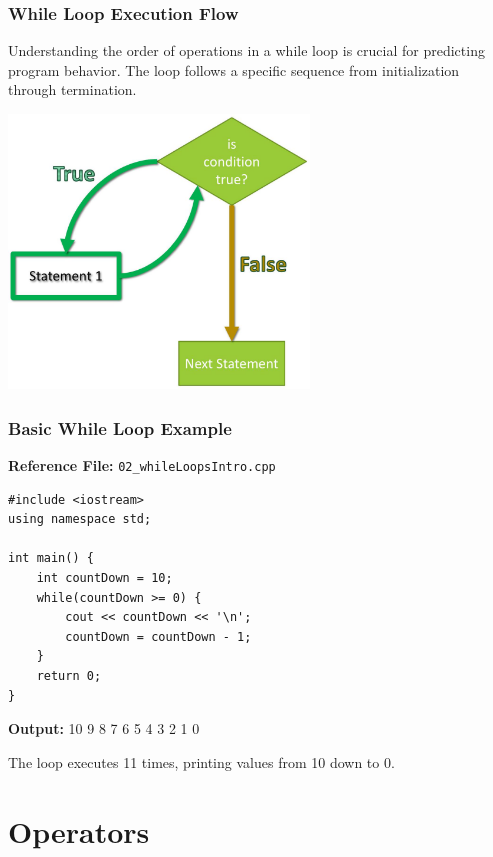 \documentclass{beamer}
\begin{document}
\begin{frame}
\frametitle{While Loop Execution Flow}
Understanding the order of operations in a while loop is crucial for predicting program behavior. The loop follows a specific sequence from initialization through termination.

\pause
\includegraphics[width=0.6\textwidth]{../images/While-Loop-Flowchart.jpg}
\end{frame}

\begin{frame}[fragile]
\frametitle{Basic While Loop Example}
\textbf{Reference File:} \texttt{02\_whileLoopsIntro.cpp}

\pause
\begin{verbatim}
#include <iostream>
using namespace std;

int main() {
    int countDown = 10;
    while(countDown >= 0) {
        cout << countDown << '\n';
        countDown = countDown - 1;
    }
    return 0;
}
\end{verbatim}

\pause
\textbf{Output:} 10 9 8 7 6 5 4 3 2 1 0

The loop executes 11 times, printing values from 10 down to 0.
\end{frame}

\section{Operators}
\end{document}
